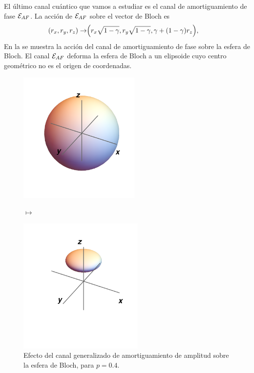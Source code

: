 El último canal cuántico que vamos a estudiar es el canal de
amortiguamiento de fase $\mathcal{E}_{AF}$. La acción de $\mathcal{E}_{AF}$
sobre el vector de Bloch es 
\begin{align}
\qty(r_x,r_y,r_z)\rightarrow&\Big(r_x\sqrt{1-\gamma},
r_y\sqrt{1-\gamma},\gamma+\qty(1-\gamma)r_z\Big),
\label{eq:damp-phase}
\end{align}
En la  se muestra la acción del canal 
de amortiguamiento de fase sobre la esfera de Bloch.
El canal $\mathcal{E}_{AF}$ deforma la esfera de Bloch a un elipsoide
cuyo centro geométrico no es el origen de coordenadas. 
\begin{figure}[H]
    \centering
    \begin{minipage}{.4\textwidth}
        \centering
        \includegraphics[width=6cm]{images/bloch-ball}
    \end{minipage}
    $\longmapsto$
    \begin{minipage}{0.4\textwidth}
        \centering
        \includegraphics[width=6.2cm]{images/gen-amplitude-damping}
    \end{minipage}
    \caption{Efecto del canal generalizado de amortiguamiento de 
        amplitud sobre la esfera de Bloch, 
        para $p=0.4$.}
    \label{fig:amp-damp}
\end{figure}

